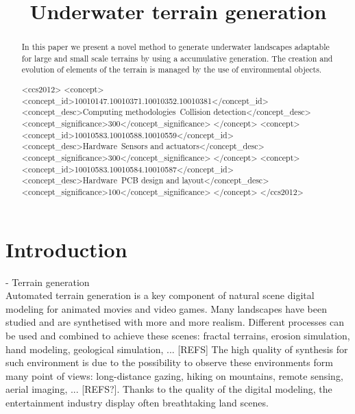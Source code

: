 \documentclass{egpubl}
\title[Underwater terrain generation]%
{Underwater terrain generation}
\author[]{}
\begin{document}

\maketitle
\begin{abstract}
	In this paper we present a novel method to generate underwater landscapes adaptable for large and small scale terrains by using a accumulative generation. The creation and evolution of elements of the terrain is managed by the use of environmental objects.
	\begin{CCSXML}
		<ccs2012>
		<concept>
		<concept_id>10010147.10010371.10010352.10010381</concept_id>
		<concept_desc>Computing methodologies~Collision detection</concept_desc>
		<concept_significance>300</concept_significance>
		</concept>
		<concept>
		<concept_id>10010583.10010588.10010559</concept_id>
		<concept_desc>Hardware~Sensors and actuators</concept_desc>
		<concept_significance>300</concept_significance>
		</concept>
		<concept>
		<concept_id>10010583.10010584.10010587</concept_id>
		<concept_desc>Hardware~PCB design and layout</concept_desc>
		<concept_significance>100</concept_significance>
		</concept>
		</ccs2012>
	\end{CCSXML}
	
	
	
	\printccsdesc   
\end{abstract}  


\section{Introduction}
- Terrain generation \\ 
Automated terrain generation is a key component of natural scene digital modeling for animated movies and video games. Many landscapes have been studied and are synthetised with more and more realism. 
Different processes can be used and combined to achieve these scenes: fractal terrains, erosion simulation, hand modeling, geological simulation, ... [REFS] The high quality of synthesis for such environment is due to the possibility to observe these environments form many point of views: long-distance gazing, hiking on mountains, remote sensing, aerial imaging, ... [REFS?]. 
Thanks to the quality of the digital modeling, the entertainment industry display often breathtaking land scenes.
\end{document}
